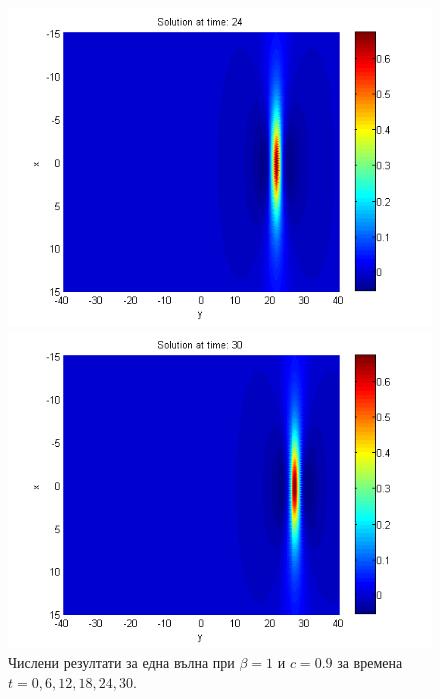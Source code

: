 \documentclass{article}
\begin{document}
\begin{figure}[ht]
\begin{minipage}[b]{0.33\linewidth}
		 \includegraphics[width=\linewidth]{../amitans/figures/solution_128x90_bt1_c090_T24.png}
	\end{minipage}
	\begin{minipage}[b]{0.33\linewidth}
		 \includegraphics[width=\linewidth]{../amitans/figures/solution_128x90_bt1_c090_T30.png}
	\end{minipage}
\caption{Числени резултати за една вълна при $\beta=1$ и $c = 0.9$ за времена $t=0,6,12,18,24,30$.}
\label{Wave2}
\end{figure}
\FloatBarrier
\end{document}
